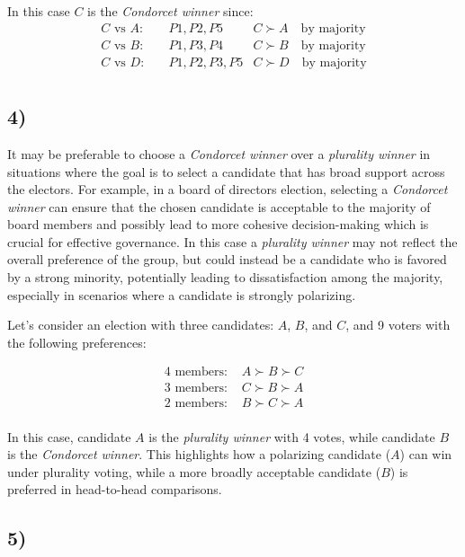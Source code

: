 \documentclass[10pt]{article}
\begin{document}
In this case $C$ is the \textit{Condorcet winner} since:
\begin{align*}
C \text{ vs } A: & \quad P1, P2, P5 &
C \succ A \quad \text{by majority}\\
C \text{ vs } B: & \quad P1, P3, P4 &
C \succ B \quad \text{by majority}\\
C \text{ vs } D: & \quad P1, P2, P3, P5 &
C \succ D \quad \text{by majority}\\
\end{align*}

\subsection*{4)}

It may be preferable to choose a \textit{Condorcet winner} over a
\textit{plurality winner} in situations where the goal is to select a
candidate that has broad support across the electors. For example, in
a board of directors election, selecting a \textit{Condorcet winner}
can ensure that the chosen candidate is acceptable to the majority of
board members and possibly lead to more cohesive decision-making
which is crucial for effective governance.
In this case a \textit{plurality winner} may not reflect the overall
preference of the group, but could instead be a candidate who is
favored by a strong minority, potentially leading to dissatisfaction
among the majority, especially in scenarios where a candidate is
strongly polarizing.

Let's consider an election with three candidates: $A$, $B$, and $C$,
and 9 voters with the following preferences:

\begin{align*}
\text{4 members: } & A \succ B \succ C \\
\text{3 members: } & C \succ B \succ A \\
\text{2 members: } & B \succ C \succ A \\
\end{align*}

In this case, candidate $A$ is the \textit{plurality winner} with 4
votes, while candidate $B$ is the \textit{Condorcet winner}. This
highlights how a polarizing candidate ($A$) can win under plurality
voting, while a more broadly acceptable candidate ($B$) is preferred
in head-to-head comparisons.

\subsection*{5)}
\end{document}
